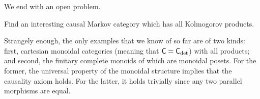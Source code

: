 \documentclass[11pt]{article}
\begin{document}
We end with an open problem.

\begin{problem}
	Find an interesting causal Markov category which has all Kolmogorov products.
\end{problem}

Strangely enough, the only examples that we know of so far are of two kinds: first, cartesian monoidal categories (meaning that $\mathsf{C} = \mathsf{C}_{\det}$) with all products; and second, the finitary complete monoids of  which are monoidal posets. For the former, the universal property of the monoidal structure implies that the causality axiom holds. For the latter, it holds trivially since any two parallel morphisms are equal.



\end{document}
